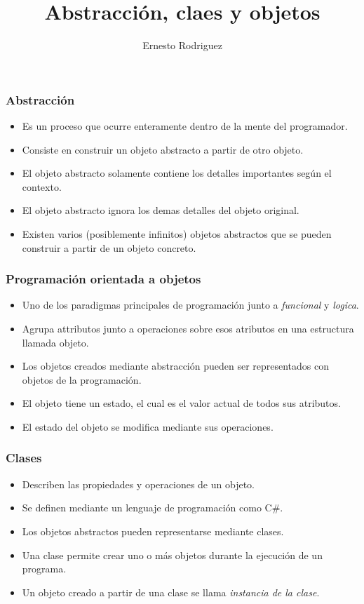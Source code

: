 \documentclass{beamer}
\title[Git]{Abstracci\'on, claes y objetos}
\author{Ernesto Rodriguez}
\institute{
    Universidad del Itsmo \\
    \medskip \textit{erodriguez@unis.edu.gt}
}
\date[\today]{}
\begin{document}
\begin{frame}
\titlepage
\end{frame}

\begin{frame}
\frametitle{Abstracci\'on}
\begin{itemize}
    \item Es un proceso que ocurre enteramente dentro de la mente del programador.
    \item Consiste en construir un objeto abstracto a partir de otro objeto.
    \item El objeto abstracto solamente contiene los detalles importantes seg\'un el contexto.
    \item El objeto abstracto ignora los demas detalles del objeto original.
    \item Existen varios (posiblemente infinitos) objetos abstractos que se pueden construir a partir de un objeto concreto.
\end{itemize}
\end{frame}

\begin{frame}
\frametitle{Programaci\'on orientada a objetos}
\begin{itemize}
    \item Uno de los paradigmas principales de programaci\'on junto a \emph{funcional} y \emph{logica}.
    \item Agrupa attributos junto a operaciones sobre esos atributos en una estructura llamada objeto.
    \item Los objetos creados mediante abstracci\'on pueden ser representados con objetos de la programaci\'on.
    \item El objeto tiene un estado, el cual es el valor actual de todos sus atributos.
    \item El estado del objeto se modifica mediante sus operaciones.
\end{itemize}
\end{frame}

\begin{frame}
\frametitle{Clases}
\begin{itemize}
    \item Describen las propiedades y operaciones de un objeto.
    \item Se definen mediante un lenguaje de programaci\'on como C\#.
    \item Los objetos abstractos pueden representarse mediante clases.
    \item Una clase permite crear uno o m\'as objetos durante la ejecuci\'on de un programa.
    \item Un objeto creado a partir de una clase se llama \emph{instancia de la clase}.
\end{itemize}
\end{frame}
\end{document}
